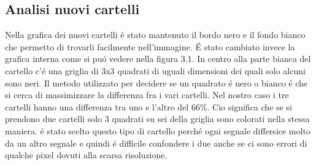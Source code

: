 	\subsection{Analisi nuovi cartelli}
		Nella grafica dei nuovi cartelli \'e stato mantenuto il bordo nero e il fondo bianco che permetto di trovarli facilmente nell'immagine. \'E stato cambiato invece la grafica interna come si pu\'o vedere nella figura 3.1. In centro alla parte bianca del cartello c'\'e una griglia di 3x3  quadrati di uguali dimensioni dei quali solo alcuni sono neri. Il metodo utilizzato per decidere se un quadrato \'e nero o bianco \'e che si cerca di massimizzare la differenza fra i vari cartelli. Nel nostro caso i tre cartelli hanno una differenza tra uno e l'altro del 66\%. Cio significa che se si prendono due cartelli solo 3 quadrati su sei della griglia sono colorati nella stessa maniera.
		\newline \'e stato scelto questo tipo di cartello perch\'e ogni segnale differsice molto da un altro segnale e quindi \'e difficile confondere i due anche se ci sono errori di qualche pixel dovuti alla scarsa risoluzione.

